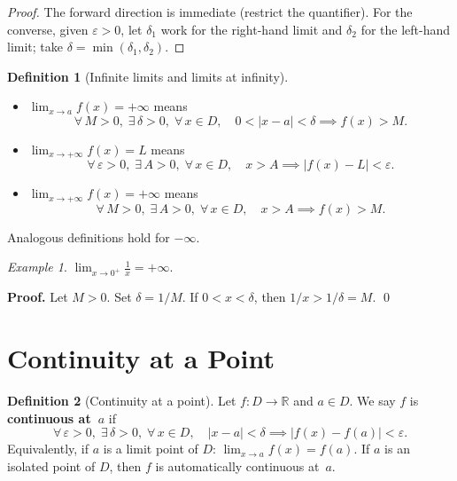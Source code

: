\documentclass[12pt,a4paper,openany]{book}
\theoremstyle{definition}
\newtheorem{definition}{Definition}[chapter]
\theoremstyle{remark}
\newtheorem{example}{Example}[chapter]
\begin{document}
\begin{proof}
The forward direction is immediate (restrict the quantifier).
For the converse, given $\varepsilon>0$, let $\delta_1$ work for the
right-hand limit and $\delta_2$ for the left-hand limit; take
$\delta=\min(\delta_1,\delta_2)$.
\end{proof}

\begin{definition}[Infinite limits and limits at infinity]
\label{def:infinite-limits}
\leavevmode
\begin{itemize}
\item $\displaystyle\lim_{x\to a}f(x)=+\infty$ means
\[
  \forall\, M>0,\;\exists\,\delta>0,\;
  \forall\, x\in D,\quad
  0<|x-a|<\delta \implies f(x)>M.
\]
\item $\displaystyle\lim_{x\to +\infty}f(x)=L$ means
\[
  \forall\,\varepsilon>0,\;\exists\, A>0,\;
  \forall\, x\in D,\quad
  x>A \implies |f(x)-L|<\varepsilon.
\]
\item $\displaystyle\lim_{x\to +\infty}f(x)=+\infty$ means
\[
  \forall\, M>0,\;\exists\, A>0,\;
  \forall\, x\in D,\quad
  x>A \implies f(x)>M.
\]
\end{itemize}
Analogous definitions hold for $-\infty$.
\end{definition}

\begin{example}
$\displaystyle\lim_{x\to 0^+}\frac{1}{x}=+\infty$.

\medskip\noindent
\textbf{Proof.}\; Let $M>0$.  Set $\delta=1/M$.  If $0<x<\delta$,
then $1/x>1/\delta=M$.  \qed
\end{example}

\section{Continuity at a Point}

\begin{definition}[Continuity at a point]\label{def:continuity-point}
Let $f\colon D\to\mathbb{R}$ and $a\in D$.  We say $f$ is
\textbf{continuous at~$a$} if
\[
  \forall\,\varepsilon>0,\;\exists\,\delta>0,\;
  \forall\, x\in D,\quad
  |x-a|<\delta \implies |f(x)-f(a)|<\varepsilon.
\]
Equivalently, if $a$ is a limit point of $D$: $\lim_{x\to a}f(x)=f(a)$.
If $a$ is an isolated point of $D$, then $f$ is automatically continuous
at~$a$.
\end{definition}
\end{document}

